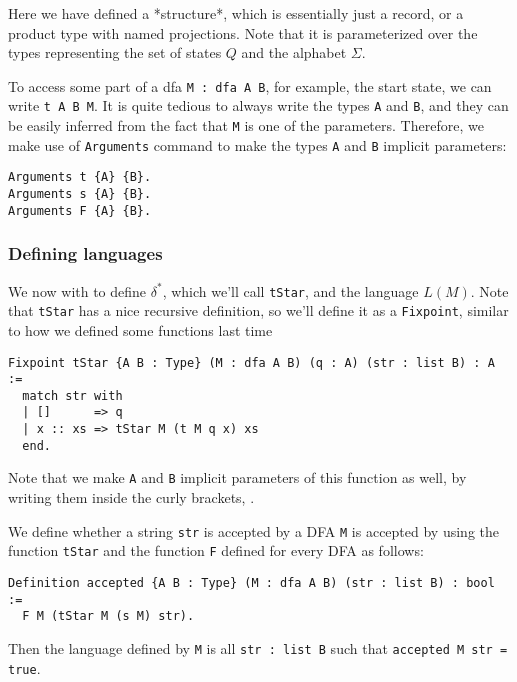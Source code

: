 Here we have defined a *structure*, which is essentially just a record, or a product type with named projections.
Note that it is parameterized over the types representing the set of states $Q$ and the alphabet $\Sigma$.

To access some part of a dfa \texttt{M : dfa A B}, for example, the start state, we can write \texttt{t A B M}.
It is quite tedious to always write the types \texttt{A} and \texttt{B}, and they can be easily inferred from the fact that \texttt{M} is one of the parameters.
Therefore, we make use of \texttt{Arguments} command to make the types \texttt{A} and \texttt{B} implicit parameters:

\begin{verbatim}
Arguments t {A} {B}.
Arguments s {A} {B}.
Arguments F {A} {B}.
\end{verbatim}

\subsubsection{Defining languages}

We now with to define $\delta^*$, which we'll call \texttt{tStar}, and the language $L(M)$.
Note that \texttt{tStar} has a nice recursive definition, so we'll define it as a \texttt{Fixpoint}, similar to how we defined some functions last time

\begin{verbatim}
Fixpoint tStar {A B : Type} (M : dfa A B) (q : A) (str : list B) : A :=
  match str with
  | []      => q
  | x :: xs => tStar M (t M q x) xs
  end.
\end{verbatim}

Note that we make \texttt{A} and \texttt{B} implicit parameters of this function as well, by writing them inside the curly brackets, \texttt{{}}.

We define whether a string \texttt{str} is accepted by a DFA \texttt{M} is accepted by using the function \texttt{tStar} and the function \texttt{F} defined for every DFA as follows:

\begin{verbatim}
Definition accepted {A B : Type} (M : dfa A B) (str : list B) : bool :=
  F M (tStar M (s M) str).
\end{verbatim}

Then the language defined by \texttt{M} is all \texttt{str : list B} such that \texttt{accepted M str = true}.

